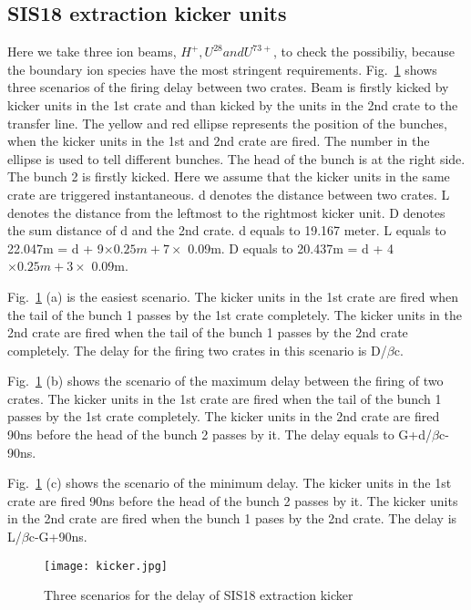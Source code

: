 \subsection{SIS18 extraction kicker units}
Here we take three ion beams, $H^+, U^{28} and U^{73+}$, to check the possibiliy, because the boundary ion species have the most stringent requirements. Fig.~\ref{kicker} shows three scenarios of the firing delay between two crates. Beam is firstly kicked by kicker units in the 1st crate and than kicked by the units in the 2nd crate to the transfer line. The yellow and red ellipse represents the position of the bunches, when the kicker units in the 1st and 2nd crate are fired. The number in the ellipse is used to tell different bunches. The head of the bunch is at the right side. The bunch 2 is firstly kicked. Here we assume that the kicker units in the same crate are triggered instantaneous. d denotes the distance between two crates. L denotes the distance from the leftmost to the rightmost kicker unit. D denotes the sum distance of d and the 2nd crate. d equals to 19.167 meter. L equals to 22.047m = d + 9$\times 0.25m + 7\times$ 0.09m. D equals to 20.437m = d + 4$\times 0.25m + 3\times$ 0.09m.

Fig.~\ref{kicker} (a) is the easiest scenario. The kicker units in the 1st crate are fired when the tail of the bunch 1 passes by the 1st crate completely. The kicker units in the 2nd crate are fired when the tail of the bunch 1 passes by the 2nd crate completely. The delay for the firing two crates in this scenario is D/$\beta$c. 

Fig.~\ref{kicker} (b) shows the scenario of the maximum delay between the firing of two crates. The kicker units in the 1st crate are fired when the tail of the bunch 1 passes by the 1st crate completely. The kicker units in the 2nd crate are fired 90ns before the head of the bunch 2 passes by it. The delay equals to G+d/$\beta$c-90ns.

Fig.~\ref{kicker} (c) shows the scenario of the minimum delay. The kicker units in the 1st crate are fired 90ns before the head of the bunch 2 passes by it. The kicker units in the 2nd crate are fired when the bunch 1 pases by the 2nd crate. The delay is L/$\beta$c-G+90ns.

\begin{figure}[!htb]
   \centering   
   \texttt{[image: kicker.jpg]}
   \caption{Three scenarios for the delay of SIS18 extraction kicker}
   \label{kicker}
\end{figure}

